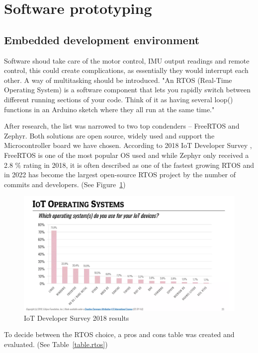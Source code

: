 \section{Software prototyping}
\subsection{Embedded development environment}

Software shoud take care of the motor control, IMU output readings and remote control, this could create complications, as essentially they would interrupt each other. A way of multitasking should be introduced.
"An RTOS (Real-Time Operating System) is a software component that lets you rapidly switch between different running sections of your code. Think of it as having several loop() functions in an Arduino sketch where they all run at the same time." \cite{Joe2019}

After research, the list was narrowed to two top condenders – FreeRTOS and Zephyr. Both solutions are open source, widely used and support the Microcontroller board we have chosen. \cite{Lemberg}
According to 2018 IoT Developer Survey \cite{IOT}, FreeRTOS is one of the most popular OS used and while Zephyr only received a 2.8 \% rating in 2018, it is often described as one of the fastest growing RTOS and in 2022 has become the largest open-source RTOS project by the number of commits and developers. (See Figure~\ref{fig:iot_os})
\begin{figure}[H]
    \centering
    \includegraphics[scale = 0.5]{pictures/iot_os.PNG}
    \caption{IoT Developer Survey 2018 results}
    \label{fig:iot_os}
\end{figure}

To decide between the RTOS choice, a pros and cons table was created and evaluated. \cite{Comparison} (See Table~\ref{table.rtos})

